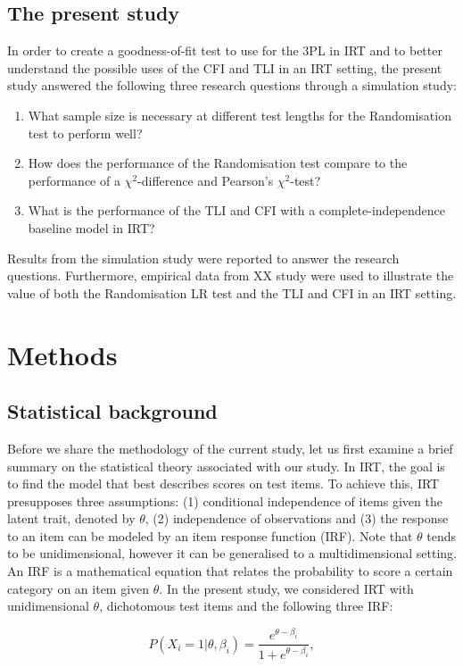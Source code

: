 \documentclass[Royal,sageapa,times,doublespace]{sagej}
\begin{document}
\subsection{The present study}
In order to create a goodness-of-fit test to use for the 3PL in IRT and to better understand the possible uses of the CFI and TLI in an IRT setting, the present study answered the following three research questions through a simulation study:
\begin{enumerate}
\item{What sample size is necessary at different test lengths for the Randomisation test to perform well?}
\item{How does the performance of the Randomisation test compare to the performance of a $\chi^2$-difference and Pearson's $\chi^2$-test?}
\item{What is the performance of the TLI and CFI with a complete-independence baseline model in IRT?}
\end{enumerate}
Results from the simulation study were reported to answer the research questions. Furthermore, empirical data from XX study were used to illustrate the value of both the Randomisation LR test and the TLI and CFI in an IRT setting.

\section{Methods}
\subsection{Statistical background}
Before we share the methodology of the current study, let us first examine a brief summary on the statistical theory associated with our study. In IRT, the goal is to find the model that best describes scores on test items. To achieve this, IRT presupposes three assumptions: (1) conditional independence of items given the latent trait, denoted by $\theta$, (2) independence of observations and (3) the response to an item can be modeled by an item response function (IRF). Note that $\theta$ tends to be unidimensional, however it can be generalised to a multidimensional setting. An IRF is a mathematical equation that relates the probability to score a certain category on an item given $\theta$. In the present study, we considered IRT with unidimensional $\theta$, dichotomous test items and the following three IRF:

\begin{equation}
P(X_i = 1 | \theta, \beta_{i}) = \frac{e^{\theta - \beta_{i}}}{1 + e^{\theta - \beta_{i}}},
\end{equation}
\end{document}
